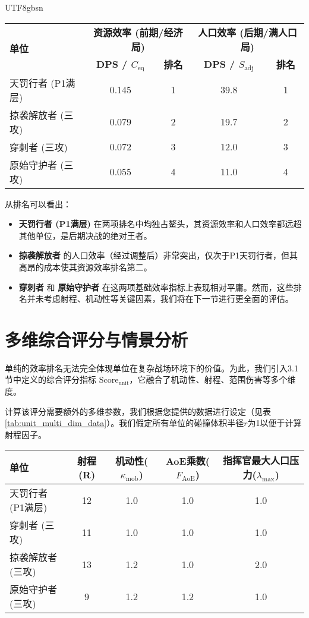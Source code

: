 \documentclass[a4paper,12pt]{article}
\begin{document}
\begin{CJK}{UTF8}{gbsn}
\begin{table*}[htbp]
\centering
\caption{后期单位综合效率排名}
\label{tab:unit_ranking}
\begin{tabular}{l|cc|cc}
\toprule
\multirow{2}{*}{\textbf{单位}} & \multicolumn{2}{c|}{\textbf{资源效率 (前期/经济局)}} & \multicolumn{2}{c}{\textbf{人口效率 (后期/满人口局)}} \\
& \textbf{DPS / $C_{\text{eq}}$} & \textbf{排名} & \textbf{DPS / $S_{\text{adj}}$} & \textbf{排名} \\
\midrule
天罚行者 (P1满层) & 0.145 & 1 & 39.8 & 1 \\
掠袭解放者 (三攻) & 0.079 & 2 & 19.7 & 2 \\
穿刺者 (三攻) & 0.072 & 3 & 12.0 & 3 \\
原始守护者 (三攻) & 0.055 & 4 & 11.0 & 4 \\
\bottomrule
\end{tabular}
\end{table*}

从排名可以看出：
\begin{itemize}
    \item \textbf{天罚行者 (P1满层)} 在两项排名中均独占鳌头，其资源效率和人口效率都远超其他单位，是后期决战的绝对王者。
    \item \textbf{掠袭解放者} 的人口效率（经过调整后）非常突出，仅次于P1天罚行者，但其高昂的成本使其资源效率排名第二。
    \item \textbf{穿刺者} 和 \textbf{原始守护者} 在这两项基础效率指标上表现相对平庸。然而，这些排名并未考虑射程、机动性等关键因素，我们将在下一节进行更全面的评估。
\end{itemize}

\section{多维综合评分与情景分析}
单纯的效率排名无法完全体现单位在复杂战场环境下的价值。为此，我们引入3.1节中定义的综合评分指标 $\text{Score}_{\text{unit}}$，它融合了机动性、射程、范围伤害等多个维度。

计算该评分需要额外的多维参数，我们根据您提供的数据进行设定（见表\ref{tab:unit_multi_dim_data}）。我们假定所有单位的碰撞体积半径$r$为1以便于计算射程因子。

\begin{table*}[htbp]
\centering
\caption{后期单位多维参数表}
\label{tab:unit_multi_dim_data}
\begin{tabular}{lcccc}
\toprule
\textbf{单位} & \textbf{射程(R)} & \textbf{机动性($\kappa_{\text{mob}}$)} & \textbf{AoE乘数($F_{\text{AoE}}$)} & \textbf{指挥官最大人口压力($\lambda_{\max}$)} \\
\midrule
天罚行者 (P1满层) & 12 & 1.0 & 1.0 & 1.0 \\
穿刺者 (三攻) & 11 & 1.0 & 1.0 & 1.0 \\
掠袭解放者 (三攻) & 13 & 1.2 & 1.0 & 2.0 \\
原始守护者 (三攻) & 9 & 1.2 & 1.2 & 1.0 \\
\bottomrule
\end{tabular}
\end{table*}


\end{CJK}
\end{document}
